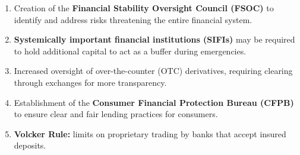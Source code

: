 
\begin{enumerate}
\item[\textcolor{rust}{\sffamily\bfseries 1)}] Creation of the \textbf{Financial
Stability Oversight Council (FSOC)} to identify and address risks threatening the
entire financial system.
\item[\textcolor{rust}{\sffamily\bfseries 2)}] \textbf{Systemically important
financial institutions (SIFIs)} may be required to hold additional capital to act
as a buffer during emergencies.
\item[\textcolor{rust}{\sffamily\bfseries 3)}] Increased oversight of
over-the-counter (OTC) derivatives, requiring clearing through exchanges for more
transparency.
\item[\textcolor{rust}{\sffamily\bfseries 4)}] Establishment of the
\textbf{Consumer Financial Protection Bureau (CFPB)} to ensure clear and fair
lending practices for consumers.
\item[\textcolor{rust}{\sffamily\bfseries 5)}] \textbf{Volcker Rule:} limits on
proprietary trading by banks that accept insured deposits.
\end{enumerate}
